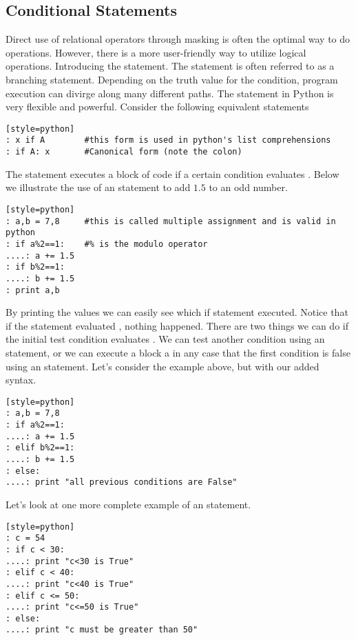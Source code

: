 

\subsection*{Conditional Statements}
Direct use of relational operators through masking is often the optimal way to do operations. However, there is a more user-friendly way to utilize logical operations.  Introducing the  statement.  The  statement is often referred to as a branching statement.  Depending on the truth value for the condition, program execution can divirge along many different paths.  The  statement in Python is very flexible and powerful.  Consider the following equivalent statements
\begin{lstlisting}[style=python][style=python]
: x if A        #this form is used in python's list comprehensions
: if A: x       #Canonical form (note the colon)
\end{lstlisting}

The  statement executes a block of code if a certain condition evaluates .  Below we illustrate the use of an  statement to add $1.5$ to an odd number.
\begin{lstlisting}[style=python][style=python]
: a,b = 7,8     #this is called multiple assignment and is valid in python
: if a%2==1:    #% is the modulo operator
....: a += 1.5
: if b%2==1:
....: b += 1.5
: print a,b
\end{lstlisting}

By printing the values we can easily see which if statement executed.  Notice that if the  statement evaluated , nothing happened.  There are two things we can do if the initial test condition evaluates .  We can test another condition using an  statement, or we can execute a block a in any case that the first condition is false using an  statement.  Let's consider the example above, but with our added syntax.
\begin{lstlisting}[style=python][style=python]
: a,b = 7,8
: if a%2==1:
....: a += 1.5
: elif b%2==1:
....: b += 1.5
: else:
....: print "all previous conditions are False"
\end{lstlisting}

Let's look at one more complete example of an  statement.  
\begin{lstlisting}[style=python][style=python]
: c = 54
: if c < 30:
....: print "c<30 is True"
: elif c < 40:
....: print "c<40 is True"
: elif c <= 50:
....: print "c<=50 is True"
: else:
....: print "c must be greater than 50"
\end{lstlisting}

